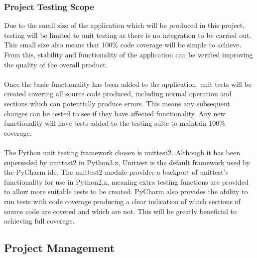 	\subsubsection{Project Testing Scope}\label{sec:project_testing_scope}
		Due to the small size of the application which will be produced in this project, testing will be limited to unit testing as there is no integration to be carried out. This small size also means that 100\% code coverage will be simple to achieve. From this, stability and functionality of the application can be verified improving the quality of the overall product.
		\\\\
		Once the basic functionality has been added to the application, unit tests will be created covering all source code produced, including normal operation and sections which can potentially produce errors. This means any subsequent changes can be tested to see if they have affected functionality. Any new functionality will have tests added to the testing suite to maintain 100\% coverage.
		\\\\
		The Python unit testing framework chosen is unittest2. Although it has been superseded by unittest2 in Python3.x, Unittest is the default framework used by the PyCharm \gls{ide}. The unittest2 module provides a backport of unittest's functionality for use in Python2.x, meaning extra testing functions are provided to allow more suitable tests to be created. PyCharm also provides the ability to run tests with code coverage producing a clear indication of which sections of source code are covered and which are not. This will be greatly beneficial to achieving full coverage.
\subsection{Project Management}\label{sec:project_management}
